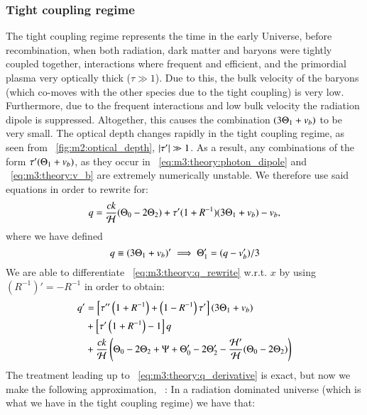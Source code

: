 \subsubsection{Tight coupling regime}\label{sec:m3:theory:tight_coupling}
    The tight coupling regime represents the time in the early Universe, before recombination, when both radiation, dark matter and baryons were tightly coupled together, interactions where frequent and efficient, and the primordial plasma very optically thick ($\tau\gg1$). Due to this, the bulk velocity of the baryons (which co-moves with the other species due to the tight coupling) is very low. Furthermore, due to the frequent interactions and low bulk velocity the radiation dipole is suppressed. Altogether, this causes the combination $(3\Theta_1+v_b)$ to be very small. The optical depth changes rapidly in the tight coupling regime, as seen from ~\cref{fig:m2:optical_depth}, $\abs{\tau'}\gg1$. As a result, any combinations of the form $\tau'(\Theta_1+v_b)$, as they occur in ~\cref{eq:m3:theory:photon_dipole} and ~\cref{eq:m3:theory:v_b} are extremely numerically unstable. We therefore use said equations in order to rewrite for:
    \begin{equation}\label{eq:m3:theory:q_rewrite}
        q = \frac{ck}{\mathcal{H}}(\Theta_0-2\Theta_2) + \tau'(1+R^{-1})(3\Theta_1+v_b) - v_b,
    \end{equation}
    where we have defined 
    \begin{equation}\label{eq:m3:theory:q_def}
        q\equiv (3\Theta_1+v_b)' \implies \Theta_1'=(q-v_b')/3
    \end{equation}
    We are able to differentiate ~\cref{eq:m3:theory:q_rewrite} w.r.t. $x$ by using $(R^{-1})' = -R^{-1}$ in order to obtain:
    \begin{equation}\label{eq:m3:theory:q_derivative}
        \begin{split}
            q' &= \left[\tau''\left(1+R^{-1}\right)+\left(1-R^{-1}\right)\tau'\right](3\Theta_1+v_b)\\
            &+\left[\tau'\left(1+R^{-1}\right)-1\right]q \\
            &+\frac{ck}{\mathcal{H}}\left(\Theta_0-2\Theta_2+\Psi+\Theta_0'-2\Theta_2'-\frac{\mathcal{H}'}{\mathcal{H}}(\Theta_0-2\Theta_2)\right)
        \end{split}
    \end{equation}
    The treatment leading up to ~\cref{eq:m3:theory:q_derivative} is exact, but now we make the following approximation, ~\cite{AST5220LectureNotes}: In a radiation dominated universe (which is what we have in the tight coupling regime) we have that:
